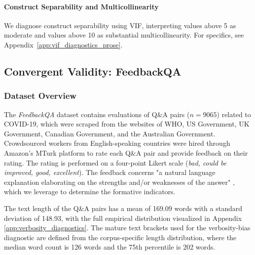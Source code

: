 \paragraph{Construct Separability and Multicollinearity}

We diagnose construct separability using VIF, interpreting values above 5 as moderate and values above 10 as substantial multicollinearity. For specifics, see Appendix~\ref{app:vif_diagnostics_prose}. 




\subsection{Convergent Validity: FeedbackQA}\label{sec:methods_feedbackqa}

\subsubsection{Dataset Overview}

The \textit{FeedbackQA} dataset \citet{li_using_2022} contains evaluations of Q\&A pairs ($n=9065$) related to COVID-19, which were scraped from the websites of WHO, US Government, UK Government, Canadian Government, and the Australian Government. Crowdsourced workers from English-speaking countries were hired through Amazon's MTurk platform to rate each Q\&A pair and provide feedback on their rating. The rating is performed on a four-point Likert scale (\textit{bad, could be improved, good, excellent}). The feedback concerns "a natural language explanation elaborating on the strengths and/or weaknesses of the answer" \citep{li_using_2022}, which we leverage to determine the formative indicators.

The text length of the Q\&A pairs has a mean of 169.09 words with a standard deviation of 148.93, with the full empirical distribution visualized in Appendix \ref{app:verbosity_diagnostics}. The mature text brackets used for the verbosity-bias diagnostic are defined from the corpus-specific length distribution, where the median word count is 126 words and the 75th percentile is 202 words.

